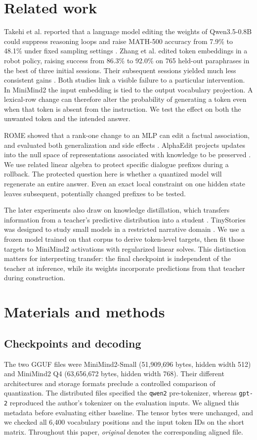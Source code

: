 \documentclass[11pt]{article}
\begin{document}
\section{Related work}
Takehi et al. reported that a language model editing the weights of Qwen3.5-0.8B could suppress reasoning loops and raise MATH-500 accuracy from 7.9\% to 48.1\% under fixed sampling settings \citep{takehi}. Zhang et al. edited token embeddings in a robot policy, raising success from 86.3\% to 92.0\% on 765 held-out paraphrases in the best of three initial sessions. Their subsequent sessions yielded much less consistent gains \citep{zhang}. Both studies link a visible failure to a particular intervention. In MiniMind2 the input embedding is tied to the output vocabulary projection. A lexical-row change can therefore alter the probability of generating a token even when that token is absent from the instruction. We test the effect on both the unwanted token and the intended answer.

ROME showed that a rank-one change to an MLP can edit a factual association, and evaluated both generalization and side effects \citep{rome}. AlphaEdit projects updates into the null space of representations associated with knowledge to be preserved \citep{alphaedit}. We use related linear algebra to protect specific dialogue prefixes during a rollback. The protected question here is whether a quantized model will regenerate an entire answer. Even an exact local constraint on one hidden state leaves subsequent, potentially changed prefixes to be tested.

The later experiments also draw on knowledge distillation, which transfers information from a teacher's predictive distribution into a student \citep{hinton}. TinyStories was designed to study small models in a restricted narrative domain \citep{tiny}. We use a frozen model trained on that corpus to derive token-level targets, then fit those targets to MiniMind2 activations with regularized linear solves. This distinction matters for interpreting transfer: the final checkpoint is independent of the teacher at inference, while its weights incorporate predictions from that teacher during construction.

\section{Materials and methods}
\subsection{Checkpoints and decoding}
The two GGUF files were MiniMind2-Small (51,909,696 bytes, hidden width 512) and MiniMind2 Q4 (63,656,672 bytes, hidden width 768). Their different architectures and storage formats preclude a controlled comparison of quantization. The distributed files specified the \texttt{qwen2} pre-tokenizer, whereas \texttt{gpt-2} reproduced the author's tokenizer on the evaluation inputs. We aligned this metadata before evaluating either baseline. The tensor bytes were unchanged, and we checked all 6,400 vocabulary positions and the input token IDs on the short matrix. Throughout this paper, \emph{original} denotes the corresponding aligned file.
\end{document}

